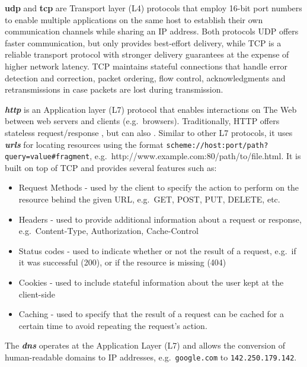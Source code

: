\textbf{\acrfull{udp}} \autocite{udpRFC} and \textbf{\acrfull{tcp}}
\autocite{tcpRFC} are Transport layer (L4) protocols that
employ 16-bit port numbers to enable multiple applications on the same
host to establish their own communication channels while sharing an IP
address. Both protocols UDP offers faster communication, but only
provides best-effort delivery, while TCP is a reliable transport
protocol with stronger delivery guarantees at the expense of higher
network latency. TCP maintains stateful connections that handle error
detection and correction, packet ordering, flow control, acknowledgments
and retransmissions in case packets are lost during transmission.

\textbf{\emph{\gls{http}}} is an Application layer (L7) protocol that
enables interactions on The Web between web servers and clients
(e.g.~browsers). Traditionally, HTTP offers stateless request/response ,
but can also . Similar to other L7 protocols, it uses
\textbf{\emph{\glspl{url}}} for locating resources using the format
\texttt{scheme://host:port/path?query=value\#fragment},
e.g.~http://www.example.com:80/path/to/file.html. It is built on top of
TCP and provides several features such as:

\begin{itemize}
\tightlist
\item
  Request Methods - used by the client to specify the action to perform
  on the resource behind the given URL, e.g.~GET, POST, PUT, DELETE,
  etc.
\item
  Headers - used to provide additional information about a request or
  response, e.g.~Content-Type, Authorization, Cache-Control
\item
  Status codes - used to indicate whether or not the result of a
  request, e.g.~if it was successful (200), or if the resource is
  missing (404)
\item
  Cookies - used to include stateful information about the user kept at
  the client-side
\item
  Caching - used to specify that the result of a request can be cached
  for a certain time to avoid repeating the request's action.
\end{itemize}

The \textbf{\emph{\gls{dns}}} operates at the Application Layer (L7) and
allows the conversion of human-readable domains to IP addresses,
e.g.~\texttt{google.com} to \texttt{142.250.179.142}.

